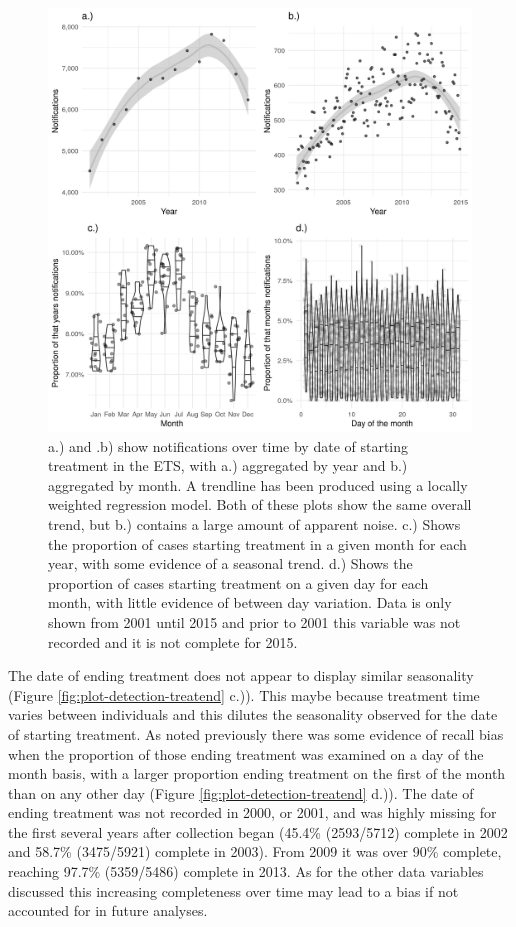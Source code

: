 \documentclass[11pt,twoside]{bristolthesis}
\begin{document}
  \begin{figure}
  
  {\centering \includegraphics[width=0.8\linewidth]{chapters/tb-epi-england/figures/plot-detection-starttreatdate} 
  
  }
  
  \caption{a.) and .b) show notifications over time by date of starting treatment in the ETS, with a.) aggregated by year and  b.) aggregated by month. A trendline has been produced using a locally weighted regression model. Both of these plots show the same overall trend, but b.) contains a large amount of apparent noise. c.) Shows the proportion of cases starting treatment in a given month for each year, with some evidence of a seasonal trend. d.) Shows the proportion of cases starting treatment on a given day for each month, with little evidence of between day variation. Data is only shown from 2001 until 2015 and prior to 2001 this variable was not recorded and it is not complete for 2015.}\label{fig:plot-detection-starttreatdate}
  \end{figure}
  The date of ending treatment does not appear to display similar seasonality (Figure \ref{fig:plot-detection-treatend} c.)). This maybe because treatment time varies between individuals and this dilutes the seasonality observed for the date of starting treatment. As noted previously there was some evidence of recall bias when the proportion of those ending treatment was examined on a day of the month basis, with a larger proportion ending treatment on the first of the month than on any other day (Figure \ref{fig:plot-detection-treatend} d.)). The date of ending treatment was not recorded in 2000, or 2001, and was highly missing for the first several years after collection began (45.4\% (2593/5712) complete in 2002 and 58.7\% (3475/5921) complete in 2003). From 2009 it was over 90\% complete, reaching 97.7\% (5359/5486) complete in 2013. As for the other data variables discussed this increasing completeness over time may lead to a bias if not accounted for in future analyses.
\end{document}
